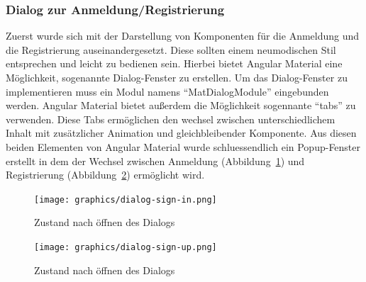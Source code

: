 \subsubsection{Dialog zur Anmeldung/Registrierung}
\label{sec:client-dialog-authentication}
Zuerst wurde sich mit der Darstellung von Komponenten für die Anmeldung und die Registrierung auseinandergesetzt. Diese sollten einem neumodischen Stil entsprechen und leicht zu bedienen sein. Hierbei bietet Angular Material eine Möglichkeit, sogenannte Dialog-Fenster zu erstellen. Um das Dialog-Fenster zu implementieren muss ein Modul namens \enquote{MatDialogModule} eingebunden werden. Angular Material bietet außerdem die Möglichkeit sogennante \enquote{tabs} zu verwenden. Diese Tabs ermöglichen den wechsel zwischen unterschiedlichem Inhalt mit zusätzlicher Animation und gleichbleibender Komponente. Aus diesen beiden Elementen von Angular Material wurde schluessendlich ein Popup-Fenster erstellt in dem der Wechsel zwischen Anmeldung (Abbildung~\ref{fig:dialog_sign_in}) und Registrierung (Abbildung~\ref{fig:dialog_sign_up}) ermöglicht wird.

\begin{figure}
	\texttt{[image: graphics/dialog-sign-in.png]}
	\caption{Zustand nach öffnen des Dialogs}
	\label{fig:dialog_sign_in}
\end{figure}

\begin{figure}
	\texttt{[image: graphics/dialog-sign-up.png]}
	\caption{Zustand nach öffnen des Dialogs}
	\label{fig:dialog_sign_up}
\end{figure}

